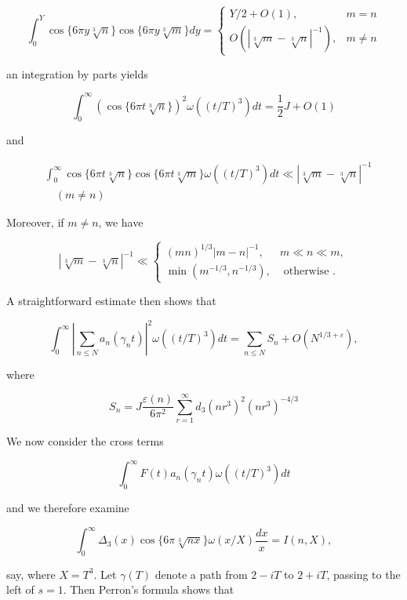 \documentclass[10pt]{article}
\begin{document}
$$
\int_{0}^{Y} \cos \{6 \pi y \sqrt[3]{n}\} \cos \{6 \pi y \sqrt[3]{m}\} d y= \begin{cases}Y / 2+O(1), & m=n \\ O\left(|\sqrt[3]{m}-\sqrt[3]{n}|^{-1}\right), & m \neq n\end{cases}
$$

an integration by parts yields


\begin{equation*}
\int_{0}^{\infty}(\cos \{6 \pi t \sqrt[3]{n}\})^{2} \omega\left((t / T)^{3}\right) d t=\frac{1}{2} J+O(1) \tag{7.2}
\end{equation*}


and


\begin{align*}
& \int_{0}^{\infty} \cos \{6 \pi t \sqrt[3]{n}\} \cos \{6 \pi t \sqrt[3]{m}\} \omega\left((t / T)^{3}\right) d t \ll|\sqrt[3]{m}-\sqrt[3]{n}|^{-1}  \tag{7.3}\\
& \quad(m \neq n)
\end{align*}


Moreover, if $m \neq n$, we have

\[
|\sqrt[3]{m}-\sqrt[3]{n}|^{-1} \ll \begin{cases}(m n)^{1 / 3}|m-n|^{-1}, & m \ll n \ll m,  \tag{7.4}\\ \min \left(m^{-1 / 3}, n^{-1 / 3}\right), & \text { otherwise } .\end{cases}
\]

A straightforward estimate then shows that


\begin{equation*}
\int_{0}^{\infty}\left|\sum_{n \leq N} a_{n}\left(\gamma_{n} t\right)\right|^{2} \omega\left((t / T)^{3}\right) d t=\sum_{n \leq N} S_{n}+O\left(N^{1 / 3+\varepsilon}\right), \tag{7.5}
\end{equation*}


where

$$
S_{n}=J \frac{\varepsilon(n)}{6 \pi^{2}} \sum_{r=1}^{\infty} d_{3}\left(n r^{3}\right)^{2}\left(n r^{3}\right)^{-4 / 3}
$$

We now consider the cross terms

$$
\int_{0}^{\infty} F(t) a_{n}\left(\gamma_{n} t\right) \omega\left((t / T)^{3}\right) d t
$$

and we therefore examine

$$
\int_{0}^{\infty} \Delta_{3}(x) \cos \{6 \pi \sqrt[3]{n x}\} \omega(x / X) \frac{d x}{x}=I(n, X),
$$

say, where $X=T^{3}$. Let $\gamma(T)$ denote a path from $2-i T$ to $2+i T$, passing to the left of $s=1$. Then Perron's formula shows that
\end{document}
